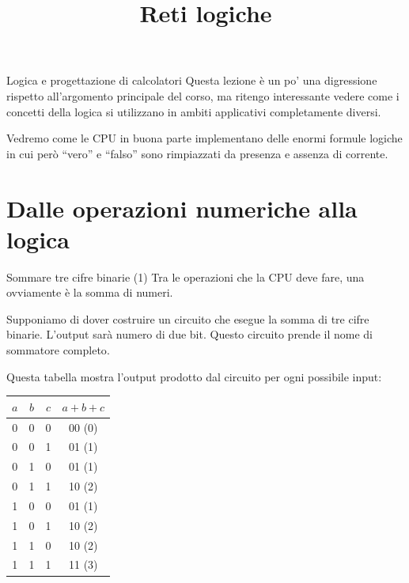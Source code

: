 \documentclass[aspectratio=169,10pt,dvipsnames,xcolor=table,handout]{beamer}
\title{Reti logiche}
\begin{document}
\begin{frame}
    \titlepage
\end{frame}

\begin{frame}{Logica e progettazione di calcolatori}
    Questa lezione è un po' una digressione rispetto all'argomento principale del corso, ma ritengo interessante vedere come i concetti della logica si utilizzano in ambiti applicativi completamente diversi.

    \medskip
    Vedremo come le CPU in buona parte implementano delle enormi formule logiche in cui però ``vero'' e ``falso'' sono rimpiazzati da presenza e assenza di corrente.
\end{frame}

\section{Dalle operazioni numeriche alla logica}

\begin{frame}{Sommare tre cifre binarie (1)}
    Tra le operazioni che la CPU deve fare, una ovviamente è la somma di numeri.

    \medskip
    Supponiamo di dover costruire un circuito che esegue la somma di tre cifre binarie. L'output sarà numero di due bit. Questo circuito prende il nome di \alert{sommatore completo}.

    \medskip
    Questa tabella mostra l'output prodotto dal circuito per ogni possibile input:
    \begin{center}
        \begin{tabular}{|c|c|c||c|}
            $a$ & $b$ & $c$ & $a+b+c$ \\
            \hline
            0   & 0   & 0   & 00 (0)  \\
            0   & 0   & 1   & 01 (1)  \\
            0   & 1   & 0   & 01 (1)  \\
            0   & 1   & 1   & 10 (2)  \\
            1   & 0   & 0   & 01 (1)  \\
            1   & 0   & 1   & 10 (2)  \\
            1   & 1   & 0   & 10 (2)  \\
            1   & 1   & 1   & 11 (3)  \\
        \end{tabular}
    \end{center}
\end{frame}
\end{document}

